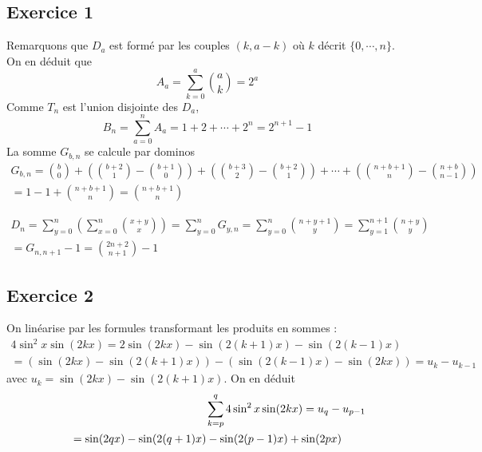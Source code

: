 \subsection*{Exercice 1}
Remarquons que $D_a$ est formé par les couples $(k,a-k)$ o{\`u} $k$
décrit $\{0,\cdots,n\}$. On en déduit que
\begin{displaymath}
A_a=\sum_{k=0}^a \binom{a}{k}=2^a
\end{displaymath}
Comme $T_n$ est l'union disjointe des $D_a$,
\begin{displaymath}
B_n=\sum_{a=0}^nA_a=1+2+\cdots+2^n=2^{n+1}-1
\end{displaymath}
La somme $G_{b,n}$ se calcule \og par dominos\fg
\begin{multline*}
G_{b,n} = 
\binom{b}{0}+(\binom{b+2}{1}-\binom{b+1}{0})+(\binom{b+3}{2}-\binom{b+2}{1})+\cdots+(\binom{n+b+1}{n}-\binom{n+b}{n-1})\\
 = 1-1+\binom{n+b+1}{n} = \binom{n+b+1}{n}
\end{multline*}

\begin{multline*}
D_n = 
\sum_{y=0}^n \left(  \sum_{x=0}^n\binom{x+y}{x} \right)
= \sum_{y=0}^nG_{y,n} = \sum_{y=0}^n\binom{n+y+1}{y} 
= \sum_{y=1}^{n+1}\binom{n+y}{y}\\
 = G_{n,n+1}-1 = \binom{2n+2}{n+1}-1
\end{multline*}

\subsection*{Exercice 2}
On linéarise par les formules transformant les produits en sommes :
\begin{multline*}
4\sin^{2}x \sin(2kx) = 2\sin (2kx)-\sin (2(k+1)x)-\sin(2(k-1)x)\\
 = (\sin (2kx)-\sin (2(k+1)x))-( \sin (2(k-1)x)-\sin (2kx)) = u_{k}-u_{k-1}
\end{multline*}
avec $u_{k}=\sin (2kx)-\sin (2(k+1)x)$.
On en déduit
\begin{multline*}
\lefteqn{\sum _{k=p}^{q}4\sin^{2}x \sin(2kx)=u_{q}-u_{p-1}}\\
 = \sin(2qx)- \sin(2(q+1)x)- \sin(2(p-1)x)+ \sin(2px)
\end{multline*}


